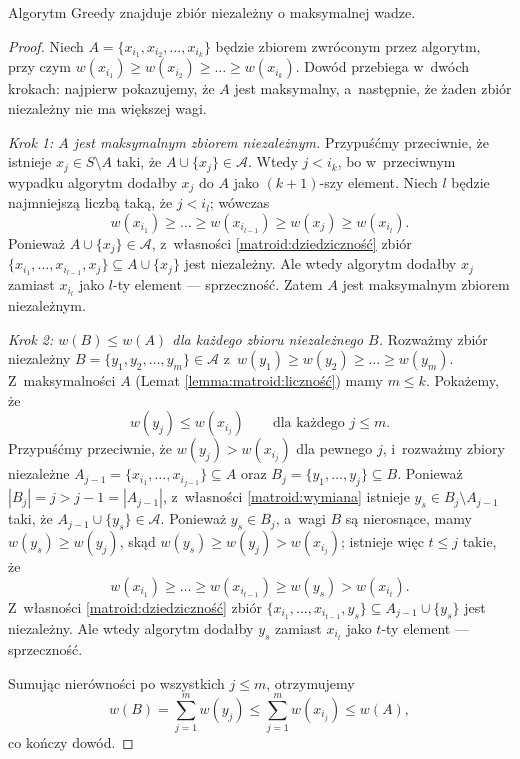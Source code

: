 \begin{theorem} \label{thm:rado-edmonds}
	Algorytm Greedy znajduje zbiór niezależny o maksymalnej wadze.
\end{theorem}
\begin{proof}
	Niech $A = \{x_{i_1}, x_{i_2}, \ldots, x_{i_k}\}$ będzie zbiorem zwróconym przez algorytm, przy czym $w(x_{i_1}) \geq w(x_{i_2}) \geq \ldots \geq w(x_{i_k})$. Dowód przebiega w~dwóch krokach: najpierw pokazujemy, że $A$ jest maksymalny, a~następnie, że żaden zbiór niezależny nie ma większej wagi.

	\emph{Krok 1: $A$ jest maksymalnym zbiorem niezależnym.}
	Przypuśćmy przeciwnie, że istnieje $x_j \in S \setminus A$ taki, że $A \cup \{x_j\} \in \mathcal{A}$. Wtedy $j < i_k$, bo w~przeciwnym wypadku algorytm dodałby $x_j$ do $A$ jako $(k+1)$-szy element. Niech $l$ będzie najmniejszą liczbą taką, że $j < i_l$; wówczas
	\[
		w(x_{i_1}) \geq \ldots \geq w(x_{i_{l-1}}) \geq w(x_j) \geq w(x_{i_l}).
	\]
	Ponieważ $A \cup \{x_j\} \in \mathcal{A}$, z~własności \ref{matroid:dziedziczność} zbiór $\{x_{i_1}, \ldots, x_{i_{l-1}}, x_j\} \subseteq A \cup \{x_j\}$ jest niezależny. Ale wtedy algorytm dodałby $x_j$ zamiast $x_{i_l}$ jako $l$-ty element --- sprzeczność. Zatem $A$ jest maksymalnym zbiorem niezależnym.

	\emph{Krok 2: $w(B) \leq w(A)$ dla każdego zbioru niezależnego $B$.}
	Rozważmy zbiór niezależny $B = \{y_1, y_2, \ldots, y_m\} \in \mathcal{A}$ z~$w(y_1) \geq w(y_2) \geq \ldots \geq w(y_m)$. Z~maksymalności $A$ (Lemat \ref{lemma:matroid:liczność}) mamy $m \leq k$. Pokażemy, że
	\[
		w(y_j) \leq w(x_{i_j}) \qquad \text{dla każdego } j \leq m.
	\]
	Przypuśćmy przeciwnie, że $w(y_j) > w(x_{i_j})$ dla pewnego $j$, i~rozważmy zbiory niezależne $A_{j-1} = \{x_{i_1}, \ldots, x_{i_{j-1}}\} \subseteq A$ oraz $B_j = \{y_1, \ldots, y_j\} \subseteq B$. Ponieważ $|B_j| = j > j-1 = |A_{j-1}|$, z~własności \ref{matroid:wymiana} istnieje $y_s \in B_j \setminus A_{j-1}$ taki, że $A_{j-1} \cup \{y_s\} \in \mathcal{A}$. Ponieważ $y_s \in B_j$, a~wagi $B$ są nierosnące, mamy $w(y_s) \geq w(y_j)$, skąd $w(y_s) \geq w(y_j) > w(x_{i_j})$; istnieje więc $t \leq j$ takie, że
	\[
		w(x_{i_1}) \geq \ldots \geq w(x_{i_{t-1}}) \geq w(y_s) > w(x_{i_t}).
	\]
	Z~własności \ref{matroid:dziedziczność} zbiór $\{x_{i_1}, \ldots, x_{i_{t-1}}, y_s\} \subseteq A_{j-1} \cup \{y_s\}$ jest niezależny. Ale wtedy algorytm dodałby $y_s$ zamiast $x_{i_t}$ jako $t$-ty element --- sprzeczność.

	Sumując nierówności po wszystkich $j \leq m$, otrzymujemy
	\[
		w(B) = \sum_{j=1}^{m} w(y_j) \leq \sum_{j=1}^{m} w(x_{i_j}) \leq w(A),
	\]
	co kończy dowód.
\end{proof}

